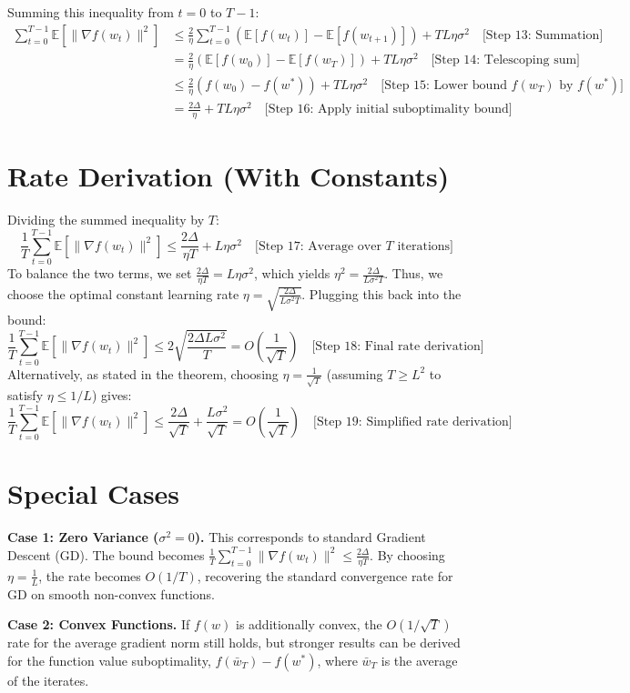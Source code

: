 \documentclass{article}
\begin{document}
Summing this inequality from $t=0$ to $T-1$:
\begin{align*}
\sum_{t=0}^{T-1} \mathbb{E}[\|\nabla f(w_t)\|^2] &\leq \frac{2}{\eta} \sum_{t=0}^{T-1} \left( \mathbb{E}[f(w_t)] - \mathbb{E}[f(w_{t+1})] \right) + T L \eta \sigma^2 \quad \text{[Step 13: Summation]} \\
&= \frac{2}{\eta} \left( \mathbb{E}[f(w_0)] - \mathbb{E}[f(w_T)] \right) + T L \eta \sigma^2 \quad \text{[Step 14: Telescoping sum]} \\
&\leq \frac{2}{\eta} \left( f(w_0) - f(w^*) \right) + T L \eta \sigma^2 \quad \text{[Step 15: Lower bound } f(w_T) \text{ by } f(w^*)] \\
&= \frac{2\Delta}{\eta} + T L \eta \sigma^2 \quad \text{[Step 16: Apply initial suboptimality bound]}
\end{align*}

\section*{Rate Derivation (With Constants)}
Dividing the summed inequality by $T$:
$$ \frac{1}{T} \sum_{t=0}^{T-1} \mathbb{E}[\|\nabla f(w_t)\|^2] \leq \frac{2\Delta}{\eta T} + L \eta \sigma^2 \quad \text{[Step 17: Average over } T \text{ iterations]} $$
To balance the two terms, we set $\frac{2\Delta}{\eta T} = L \eta \sigma^2$, which yields $\eta^2 = \frac{2\Delta}{L \sigma^2 T}$. Thus, we choose the optimal constant learning rate $\eta = \sqrt{\frac{2\Delta}{L \sigma^2 T}}$. 
Plugging this back into the bound:
$$ \frac{1}{T} \sum_{t=0}^{T-1} \mathbb{E}[\|\nabla f(w_t)\|^2] \leq 2 \sqrt{\frac{2\Delta L \sigma^2}{T}} = O\left(\frac{1}{\sqrt{T}}\right) \quad \text{[Step 18: Final rate derivation]} $$
Alternatively, as stated in the theorem, choosing $\eta = \frac{1}{\sqrt{T}}$ (assuming $T \geq L^2$ to satisfy $\eta \leq 1/L$) gives:
$$ \frac{1}{T} \sum_{t=0}^{T-1} \mathbb{E}[\|\nabla f(w_t)\|^2] \leq \frac{2\Delta}{\sqrt{T}} + \frac{L\sigma^2}{\sqrt{T}} = O\left(\frac{1}{\sqrt{T}}\right) \quad \text{[Step 19: Simplified rate derivation]} $$

\section*{Special Cases}
\textbf{Case 1: Zero Variance ($\sigma^2 = 0$).} This corresponds to standard Gradient Descent (GD). The bound becomes $\frac{1}{T} \sum_{t=0}^{T-1} \|\nabla f(w_t)\|^2 \leq \frac{2\Delta}{\eta T}$. By choosing $\eta = \frac{1}{L}$, the rate becomes $O(1/T)$, recovering the standard convergence rate for GD on smooth non-convex functions.

\textbf{Case 2: Convex Functions.} If $f(w)$ is additionally convex, the $O(1/\sqrt{T})$ rate for the average gradient norm still holds, but stronger results can be derived for the function value suboptimality, $f(\bar{w}_T) - f(w^*)$, where $\bar{w}_T$ is the average of the iterates.
\end{document}
